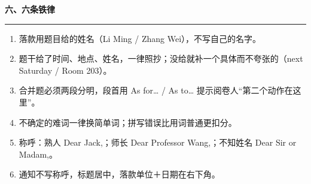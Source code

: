 \documentclass[11pt,a4paper]{ctexart}
\begin{document}
\vspace{7pt}
{\color{accent}\bfseries 六、六条铁律}\par
{\color{rule}\rule{\linewidth}{0.5pt}}\par\vspace{2pt}
{\footnotesize
\begin{enumerate}[leftmargin=1.4em,itemsep=0.5pt,topsep=1pt,parsep=0pt]
\item 落款用题目给的姓名（Li Ming / Zhang Wei），不写自己的名字。
\item 题干给了时间、地点、姓名，一律照抄；没给就补一个具体而不夸张的（next Saturday / Room 203）。
\item 合并题必须两段分明，段首用 As for… / As to… 提示阅卷人“第二个动作在这里”。
\item 不确定的难词一律换简单词；拼写错误比用词普通更扣分。
\item 称呼：熟人 Dear Jack,；师长 Dear Professor Wang,；不知姓名 Dear Sir or Madam,。
\item 通知不写称呼，标题居中，落款单位＋日期在右下角。
\end{enumerate}}\par
\end{document}
